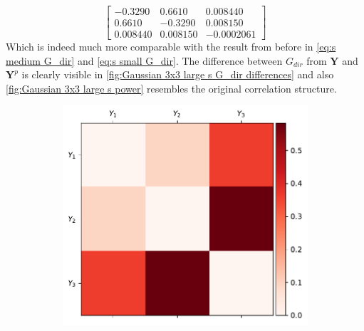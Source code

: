 \documentclass[../Thesis.tex]{subfiles}
\begin{document}
\begin{example}
$$\begin{bmatrix}
            -0.3290  & 0.6610   & 0.008440   \\
            0.6610   & -0.3290  & 0.008150   \\
            0.008440 & 0.008150 & -0.0002061
        \end{bmatrix}
    $$
    Which is indeed much more comparable with the result from before in \autoref{eq:s medium G_dir} and \autoref{eq:s small G_dir}. The difference between $G_{dir}$ from $\boldsymbol Y$ and $\boldsymbol Y^p$ is clearly visible in \autoref{fig:Gaussian 3x3 large s G_dir differences} and also \autoref{fig:Gaussian 3x3 large s power} resembles the original correlation structure.
    \begin{figure}[H]
        \centering
        \begin{subfigure}[t]{0.49\textwidth}
            \centering
            \includegraphics[width=\linewidth]{figures/ND examples/Gaussian 3x3 large s.pdf}
            \caption{}
            \label{fig:Gaussian 3x3 large s}
        \end{subfigure}%
        ~
        \begin{subfigure}[t]{0.49\textwidth}
            \centering

\end{subfigure}
\end{figure}
\end{example}
\end{document}

